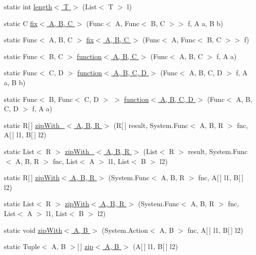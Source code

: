 \begin{DoxyCompactItemize}
\item 
static int \hyperlink{class_prelude_acf628e78e64497cef80b6614b18b063c}{length$<$ T $>$} (List$<$ T $>$ l)
\item 
static C \hyperlink{class_prelude_a64658b2644e39927f8a87758cc6cb43a}{fix$<$ A, B, C $>$} (Func$<$ A, Func$<$ B, C $>$$>$ f, A a, B b)
\item 
static Func$<$ A, B, C $>$ \hyperlink{class_prelude_a5dd79e480ecf644df8b61511c4302364}{fix$<$ A, B, C $>$} (Func$<$ A, Func$<$ B, C $>$$>$ f)
\item 
static Func$<$ B, C $>$ \hyperlink{class_prelude_ab893ee6759a9e2328c9033fafcfd1feb}{function$<$ A, B, C $>$} (Func$<$ A, B, C $>$ f, A a)
\item 
static Func$<$ C, D $>$ \hyperlink{class_prelude_a152044352ba130b5392f60aa3ca14566}{function$<$ A, B, C, D $>$} (Func$<$ A, B, C, D $>$ f, A a, B b)
\item 
static Func$<$ B, Func$<$ C, D $>$ $>$ \hyperlink{class_prelude_aa4bfc687dd03dac7dba7cd6ade99a4e4}{function$<$ A, B, C, D $>$} (Func$<$ A, B, C, D $>$ f, A a)
\item 
static R\mbox{[}$\,$\mbox{]} \hyperlink{class_prelude_a9a63dbcdc56f77f7b564f2c7e9113e81}{zip\+With\+\_\+$<$ A, B, R $>$} (R\mbox{[}$\,$\mbox{]} result, System.\+Func$<$ A, B, R $>$ fnc, A\mbox{[}$\,$\mbox{]} l1, B\mbox{[}$\,$\mbox{]} l2)
\item 
static List$<$ R $>$ \hyperlink{class_prelude_a92f60c86aeefbad0d2ef25d7d1595c70}{zip\+With\+\_\+$<$ A, B, R $>$} (List$<$ R $>$ result, System.\+Func$<$ A, B, R $>$ fnc, List$<$ A $>$ l1, List$<$ B $>$ l2)
\item 
static R\mbox{[}$\,$\mbox{]} \hyperlink{class_prelude_abfdba03e18a88d1a2df66b3fd0f222f4}{zip\+With$<$ A, B, R $>$} (System.\+Func$<$ A, B, R $>$ fnc, A\mbox{[}$\,$\mbox{]} l1, B\mbox{[}$\,$\mbox{]} l2)
\item 
static List$<$ R $>$ \hyperlink{class_prelude_a35e05fd706d92c1db83db1062214535d}{zip\+With$<$ A, B, R $>$} (System.\+Func$<$ A, B, R $>$ fnc, List$<$ A $>$ l1, List$<$ B $>$ l2)
\item 
static void \hyperlink{class_prelude_a6f119a24a6ba0e4ed05650dde88ae33d}{zip\+With$<$ A, B $>$} (System.\+Action$<$ A, B $>$ fnc, A\mbox{[}$\,$\mbox{]} l1, B\mbox{[}$\,$\mbox{]} l2)
\item 
static Tuple$<$ A, B $>$\mbox{[}$\,$\mbox{]} \hyperlink{class_prelude_a332998c9d498bd48f2f0988599221ec8}{zip$<$ A, B $>$} (A\mbox{[}$\,$\mbox{]} l1, B\mbox{[}$\,$\mbox{]} l2)
\item 

\end{DoxyCompactItemize}
